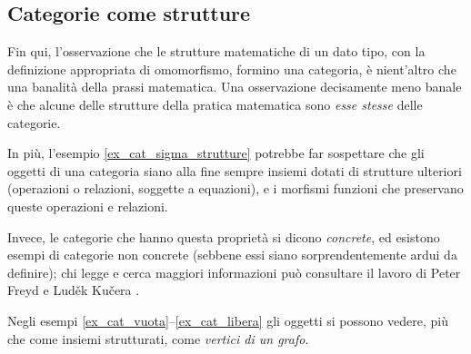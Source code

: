 \subsection{Categorie come strutture}\label{ssec:categorie_strutture}
Fin qui, l'osservazione che le strutture matematiche di un dato tipo, con la definizione appropriata di omomorfismo, formino una categoria, è nient'altro che una banalità della prassi matematica. Una osservazione decisamente meno banale è che alcune delle strutture della pratica matematica sono \emph{esse stesse} delle categorie.

In più, l'esempio \ref{ex_cat_sigma_strutture} potrebbe far sospettare che gli oggetti di una categoria siano alla fine sempre insiemi dotati di strutture ulteriori (operazioni o relazioni, soggette a equazioni), e i morfismi funzioni che preservano queste operazioni e relazioni.

Invece, le categorie che hanno questa proprietà si dicono \emph{concrete}, ed esistono esempi di categorie non concrete (sebbene essi siano sorprendentemente ardui da definire); chi legge e cerca maggiori informazioni può consultare il lavoro di Peter Freyd e Lud\v{e}k Ku\v{c}era \cite{Freyd1973,Kuera1971}.

Negli esempi \ref{ex_cat_vuota}--\ref{ex_cat_libera} gli oggetti si possono vedere, più che come insiemi strutturati, come \emph{vertici di un grafo}.

